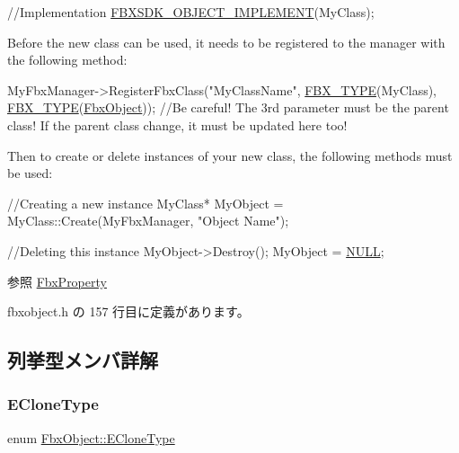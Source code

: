 \begin{DoxyCode}
\textcolor{comment}{//Implementation}
\hyperlink{fbxobject_8h_ac76185d8d380cda2e3d5c10981e5f510}{FBXSDK\_OBJECT\_IMPLEMENT}(MyClass);
\end{DoxyCode}
 Before the new class can be used, it needs to be registered to the manager with the following method\+: 
\begin{DoxyCode}
MyFbxManager->RegisterFbxClass(\textcolor{stringliteral}{"MyClassName"}, \hyperlink{fbxobject_8h_a5d7afc748adbd02b6e42e01ec252f29e}{FBX\_TYPE}(MyClass), 
      \hyperlink{fbxobject_8h_a5d7afc748adbd02b6e42e01ec252f29e}{FBX\_TYPE}(\hyperlink{class_fbx_object}{FbxObject}));  \textcolor{comment}{//Be careful! The 3rd parameter must be the parent class! If the
       parent class change, it must be updated here too!}
\end{DoxyCode}
 Then to create or delete instances of your new class, the following methods must be used\+: 
\begin{DoxyCode}
\textcolor{comment}{//Creating a new instance}
MyClass* MyObject = MyClass::Create(MyFbxManager, \textcolor{stringliteral}{"Object Name"});

\textcolor{comment}{//Deleting this instance}
MyObject->Destroy();
MyObject = \hyperlink{fbxarch_8h_a070d2ce7b6bb7e5c05602aa8c308d0c4}{NULL};
\end{DoxyCode}
 \begin{DoxySeeAlso}{参照}
\hyperlink{class_fbx_property}{Fbx\+Property} 
\end{DoxySeeAlso}


 fbxobject.\+h の 157 行目に定義があります。



\subsection{列挙型メンバ詳解}
\mbox{\label{class_fbx_object_a9f5626b2d2135684d6ea1e6e4ad2acbb}} 
\subsubsection{\texorpdfstring{E\+Clone\+Type}{ECloneType}}
{\footnotesize\ttfamily enum \hyperlink{class_fbx_object_a9f5626b2d2135684d6ea1e6e4ad2acbb}{Fbx\+Object\+::\+E\+Clone\+Type}}




